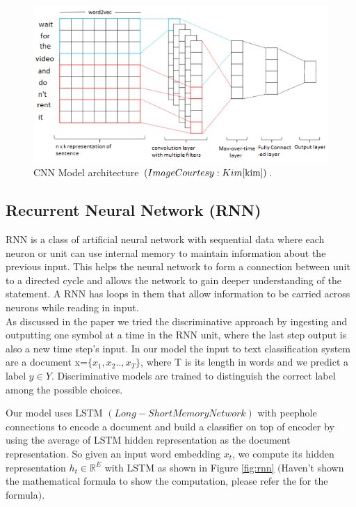 \documentclass[11pt]{article}
\begin{document}
		\begin{figure}
			\includegraphics[width=\linewidth]{CNN.png}
			\caption{CNN Model architecture $(Image Courtesy:Kim \cite{kim})$. }
			\label{fig:cnn}
		\end{figure}
		\subsection{Recurrent Neural Network (RNN)}
		
		RNN is a class of artificial neural network with sequential data where each neuron or unit can use internal memory to maintain information about the previous input. This helps the neural network to form a connection between unit to a directed cycle and allows the network to gain deeper understanding of the statement. A RNN has loops in them that allow information to be carried across neurons while reading in input.\\
		
		As discussed in the paper \cite{ydlb} we tried the discriminative approach by ingesting and outputting one symbol at a time in the RNN unit, where the last step output is also a new time step's input. In our model the input to text classification system are a document x=$\{x_1,x_2..,x_T\}$, where T is its length in words and we predict a label $y \in Y$. Discriminative models are trained to distinguish the correct label among the possible choices.
		
		Our model uses LSTM $(Long-Short Memory Network)$ with peephole connections to encode a document and build a classifier on top of encoder by using the average of LSTM hidden representation as the document representation. So given an input word embedding $x_t$, we compute its hidden representation $h_t \in \mathbb{R}^E$ with LSTM as shown in Figure \ref{fig:rnn} $($Haven't shown the mathematical formula to show the computation, please refer the \cite{ydlb} for the formula$)$.\\
		
\end{document}
